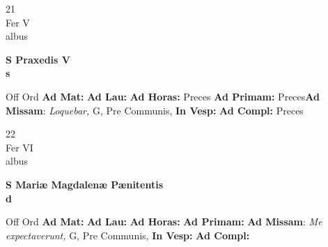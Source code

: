\documentclass[10pt, openany]{book}
\begin{document}
        \begin{center}
            \begin{minipage}{3.5in}
                \vspace{2em}
                \begin{minipage}{0.5in}
                    {\Huge 21} \\
                    {\normalsize Fer V} \\
                    {\normalsize albus}
                \end{minipage}
                \begin{minipage}{3.0in}
                    \textbf{ \large S Praxedis V \\
                    \textnormal{\normalsize s}} \\ 
                \end{minipage}
                \begin{justify}Off Ord
                    \textbf{Ad Mat: }
                    \textbf{Ad Lau: }
                    \textbf{Ad Horas: }Preces
                    \textbf{Ad Primam: }Preces\textbf{Ad Missam}: \textit{Loquebar,} G, Pre Communis,  
                    \textbf{In Vesp: }
                    \textbf{Ad Compl: }Preces
                \end{justify}
            \end{minipage}
        \end{center}
    
        \begin{center}
            \begin{minipage}{3.5in}
                \vspace{2em}
                \begin{minipage}{0.5in}
                    {\Huge 22} \\
                    {\normalsize Fer VI} \\
                    {\normalsize albus}
                \end{minipage}
                \begin{minipage}{3.0in}
                    \textbf{ \large S Mariæ Magdalenæ Pænitentis \\
                    \textnormal{\normalsize d}} \\ 
                \end{minipage}
                \begin{justify}Off Ord
                    \textbf{Ad Mat: }
                    \textbf{Ad Lau: }
                    \textbf{Ad Horas: }
                    \textbf{Ad Primam: }\textbf{Ad Missam}: \textit{Me expectaverunt,} G, Pre Communis,  
                    \textbf{In Vesp: }
                    \textbf{Ad Compl: }
                \end{justify}
            \end{minipage}
        \end{center}
    
\end{document}
